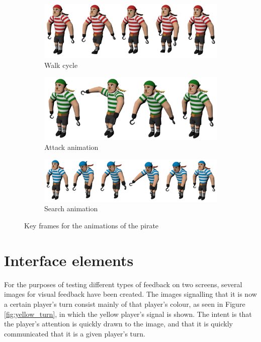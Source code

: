 \begin{figure}[h!]
	\centering
	\begin{subfigure}[b]{\textwidth}
		\centering
		\includegraphics[scale=0.2]{figures/walk_cycle.png}
		\caption{Walk cycle}
		\label{fig:walk_cycle}
	\end{subfigure}
	
	\begin{subfigure}[b]{\textwidth}
		\centering
		\includegraphics[scale=0.2]{figures/attack_anim.png}
		\caption{Attack animation}
		\label{fig:attack_anim}
	\end{subfigure}
	
	\begin{subfigure}[b]{\textwidth}
		\centering
		\includegraphics[scale=0.2]{figures/search_anim.png}
		\caption{Search animation}
		\label{fig:search_anim}
	\end{subfigure}
	\caption{Key frames for the animations of the pirate}
	\label{fig:key_frames}
\end{figure}

\section{Interface elements}
For the purposes of testing different types of feedback on two screens, several images for visual feedback have been created. The images signalling that it is now a certain player's turn consist mainly of that player's colour, as seen in Figure \ref{fig:yellow_turn}, in which the yellow player's signal is shown. The intent is that the player's attention is quickly drawn to the image, and that it is quickly communicated that it is a given player's turn.

